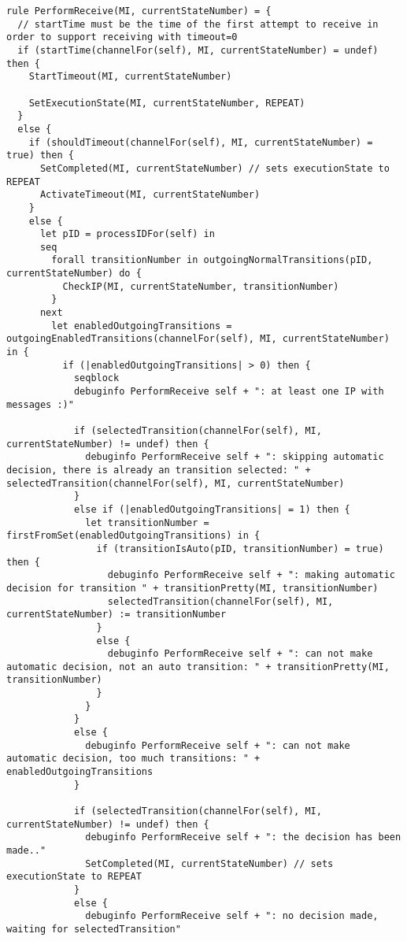 \begin{listing}[H]
\begin{verbatim}
rule PerformReceive(MI, currentStateNumber) = {
  // startTime must be the time of the first attempt to receive in order to support receiving with timeout=0
  if (startTime(channelFor(self), MI, currentStateNumber) = undef) then {
    StartTimeout(MI, currentStateNumber)

    SetExecutionState(MI, currentStateNumber, REPEAT)
  }
  else {
    if (shouldTimeout(channelFor(self), MI, currentStateNumber) = true) then {
      SetCompleted(MI, currentStateNumber) // sets executionState to REPEAT
      ActivateTimeout(MI, currentStateNumber)
    }
    else {
      let pID = processIDFor(self) in
      seq
        forall transitionNumber in outgoingNormalTransitions(pID, currentStateNumber) do {
          CheckIP(MI, currentStateNumber, transitionNumber)
        }
      next
        let enabledOutgoingTransitions = outgoingEnabledTransitions(channelFor(self), MI, currentStateNumber) in {
          if (|enabledOutgoingTransitions| > 0) then {
            seqblock
            debuginfo PerformReceive self + ": at least one IP with messages :)"

            if (selectedTransition(channelFor(self), MI, currentStateNumber) != undef) then {
              debuginfo PerformReceive self + ": skipping automatic decision, there is already an transition selected: " + selectedTransition(channelFor(self), MI, currentStateNumber)
            }
            else if (|enabledOutgoingTransitions| = 1) then {
              let transitionNumber = firstFromSet(enabledOutgoingTransitions) in {
                if (transitionIsAuto(pID, transitionNumber) = true) then {
                  debuginfo PerformReceive self + ": making automatic decision for transition " + transitionPretty(MI, transitionNumber)
                  selectedTransition(channelFor(self), MI, currentStateNumber) := transitionNumber
                }
                else {
                  debuginfo PerformReceive self + ": can not make automatic decision, not an auto transition: " + transitionPretty(MI, transitionNumber)
                }
              }
            }
            else {
              debuginfo PerformReceive self + ": can not make automatic decision, too much transitions: " + enabledOutgoingTransitions
            }

            if (selectedTransition(channelFor(self), MI, currentStateNumber) != undef) then {
              debuginfo PerformReceive self + ": the decision has been made.."
              SetCompleted(MI, currentStateNumber) // sets executionState to REPEAT
            }
            else {
              debuginfo PerformReceive self + ": no decision made, waiting for selectedTransition"


\end{verbatim}
\end{listing}
